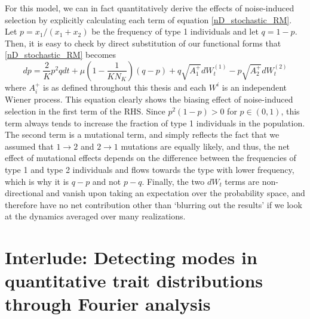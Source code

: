 For this model, we can in fact quantitatively derive the effects of noise-induced selection by explicitly calculating each term of equation \eqref{nD_stochastic_RM}. Let $p = x_1/(x_1 + x_2)$ be the frequency of type 1 individuals and let $q = 1-p$. Then, it is easy to check by direct substitution of our functional forms that \eqref{nD_stochastic_RM} becomes
\begin{equation}
	dp =  \frac{2}{K}p^2qdt + \mu\left(1-\frac{1}{KN_K}\right)\left(q-p\right) + q\sqrt{A^{+}_1}dW_t^{(1)} - p\sqrt{A^{+}_2}dW_t^{(2)}
\end{equation}
where $A_i^{+}$ is as defined throughout this thesis and each $W^{i}$ is an independent Wiener process. This equation clearly shows the biasing effect of noise-induced selection in the first term of the RHS. Since $p^2(1-p) > 0$ for $p \in (0,1)$, this term always tends to increase the fraction of type 1 individuals in the population. The second term is a mutational term, and simply reflects the fact that we assumed that $1 \to 2$ and $2 \to 1$ mutations are equally likely, and thus, the net effect of mutational effects depends on the difference between the frequencies of type 1 and type 2 individuals and flows towards the type with lower frequency, which is why it is $q-p$ and not $p-q$. Finally, the two $dW_t$ terms are non-directional and vanish upon taking an expectation over the probability space, and therefore have no net contribution other than `blurring out the results' if we look at the dynamics averaged over many realizations.

\section{Interlude: Detecting modes in quantitative trait distributions through Fourier analysis}

